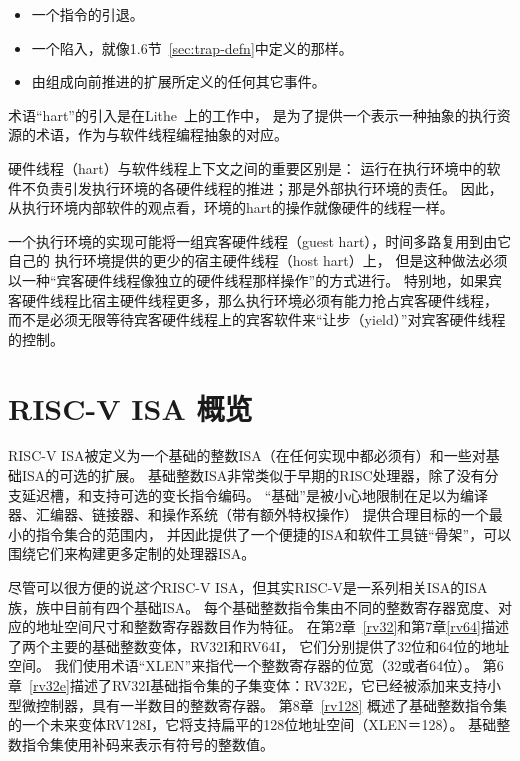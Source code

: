 \vspace{-0.2in}
\begin{itemize}
\parskip 0pt
\itemsep 1pt
\item 一个指令的引退。
\item 一个陷入，就像1.6节~\ref{sec:trap-defn}中定义的那样。
\item 由组成向前推进的扩展所定义的任何其它事件。
\end{itemize}

\begin{commentary}
术语“hart”的引入是在Lithe~\cite{lithe-pan-hotpar09,lithe-pan-pldi10}上的工作中，
是为了提供一个表示一种抽象的执行资源的术语，作为与软件线程编程抽象的对应。

硬件线程（hart）与软件线程上下文之间的重要区别是：
运行在执行环境中的软件不负责引发执行环境的各硬件线程的推进；那是外部执行环境的责任。
因此，从执行环境内部软件的观点看，环境的hart的操作就像硬件的线程一样。

一个执行环境的实现可能将一组宾客硬件线程（guest hart），时间多路复用到由它自己的
执行环境提供的更少的宿主硬件线程（host hart）上，
但是这种做法必须以一种“宾客硬件线程像独立的硬件线程那样操作”的方式进行。
特别地，如果宾客硬件线程比宿主硬件线程更多，那么执行环境必须有能力抢占宾客硬件线程，
而不是必须无限等待宾客硬件线程上的宾客软件来“让步（yield）”对宾客硬件线程的控制。

\end{commentary}

\section{RISC-V ISA 概览}

RISC-V ISA被定义为一个基础的整数ISA（在任何实现中都必须有）和一些对基础ISA的可选的扩展。
基础整数ISA非常类似于早期的RISC处理器，除了没有分支延迟槽，和支持可选的变长指令编码。
“基础”是被小心地限制在足以为编译器、汇编器、链接器、和操作系统（带有额外特权操作）
提供合理目标的一个最小的指令集合的范围内，
并因此提供了一个便捷的ISA和软件工具链“骨架”，可以围绕它们来构建更多定制的处理器ISA。

尽管可以很方便的说{\em 这个}RISC-V ISA，但其实RISC-V是一系列相关ISA的ISA族，族中目前有四个基础ISA。
每个基础整数指令集由不同的整数寄存器宽度、对应的地址空间尺寸和整数寄存器数目作为特征。
在第2章~\ref{rv32}和第7章\ref{rv64}描述了两个主要的基础整数变体，RV32I和RV64I，
它们分别提供了32位和64位的地址空间。
我们使用术语“XLEN”来指代一个整数寄存器的位宽（32或者64位）。
第6章~\ref{rv32e}描述了RV32I基础指令集的子集变体：RV32E，它已经被添加来支持小型微控制器，具有一半数目的整数寄存器。
第8章~\ref{rv128} 概述了基础整数指令集的一个未来变体RV128I，它将支持扁平的128位地址空间（XLEN＝128）。
基础整数指令集使用补码来表示有符号的整数值。

